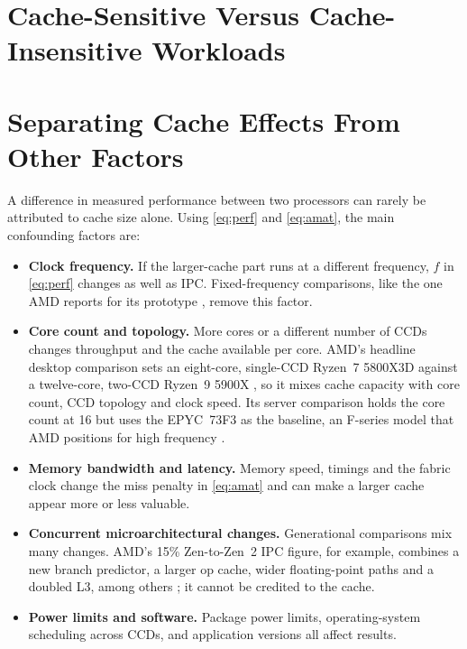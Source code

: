 
\section{Cache-Sensitive Versus Cache-Insensitive Workloads}
\label{sec:workload-sensitivity}

\section{Separating Cache Effects From Other Factors}
\label{sec:confounds}

A difference in measured performance between two processors can rarely be attributed to cache size alone. Using \cref{eq:perf} and \cref{eq:amat}, the main confounding factors are:
\begin{itemize}
  \item \textbf{Clock frequency.} If the larger-cache part runs at a different frequency, $f$ in \cref{eq:perf} changes as well as IPC. Fixed-frequency comparisons, like the one AMD reports for its prototype \cite{swaminathanAdvancedPackagingEnabling2021}, remove this factor.
  \item \textbf{Core count and topology.} More cores or a different number of CCDs changes throughput and the cache available per core. AMD's headline desktop comparison sets an eight-core, single-CCD Ryzen~7 5800X3D against a twelve-core, two-CCD Ryzen~9 5900X \cite[slide~29]{wuu2022vcache}, so it mixes cache capacity with core count, CCD topology and clock speed. Its server comparison holds the core count at 16 but uses the EPYC~73F3 as the baseline, an F-series model that AMD positions for high frequency \cite{amd2022epyc7003,wuu2022vcache}.
  \item \textbf{Memory bandwidth and latency.} Memory speed, timings and the fabric clock change the miss penalty in \cref{eq:amat} and can make a larger cache appear more or less valuable.
  \item \textbf{Concurrent microarchitectural changes.} Generational comparisons mix many changes. AMD's 15\% Zen-to-Zen~2 IPC figure, for example, combines a new branch predictor, a larger op cache, wider floating-point paths and a doubled L3, among others \cite{suggs2019zen2}; it cannot be credited to the cache.
  \item \textbf{Power limits and software.} Package power limits, operating-system scheduling across CCDs, and application versions all affect results.
\end{itemize}

